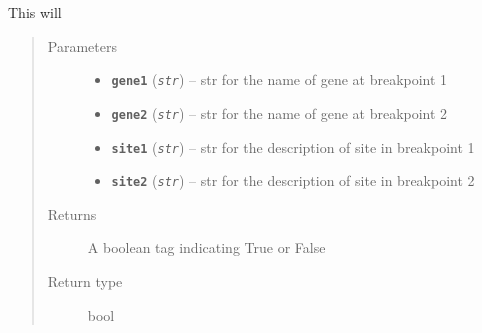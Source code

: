 \documentclass[letterpaper,10pt,english]{sphinxmanual}
\begin{document}

\begin{fulllineitems}
\label{iCallSV:iCallSV.filterAnnotatedSV.checkEventInIntronFlag}
This will 
\begin{quote}\begin{description}
\item[{Parameters}] \leavevmode\begin{itemize}
\item {} 
\textbf{\texttt{gene1}} (\emph{\texttt{str}}) -- str for the name of gene at breakpoint 1

\item {} 
\textbf{\texttt{gene2}} (\emph{\texttt{str}}) -- str for the name of gene at breakpoint 2

\item {} 
\textbf{\texttt{site1}} (\emph{\texttt{str}}) -- str for the description of site in breakpoint 1

\item {} 
\textbf{\texttt{site2}} (\emph{\texttt{str}}) -- str for the description of site in breakpoint 2

\end{itemize}

\item[{Returns}] \leavevmode
A boolean tag indicating True or False

\item[{Return type}] \leavevmode
bool

\end{description}\end{quote}

\end{fulllineitems}


\begin{fulllineitems}
\label{iCallSV:iCallSV.filterAnnotatedSV.checkGeneListToKeep}
\end{fulllineitems}

\end{document}
